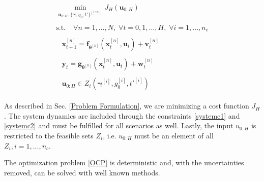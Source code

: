\begin{subequations}
\begin{align}
\begin{split}
\min\limits_{\boldsymbol{u}_{0:H}, \{ \boldsymbol{\gamma}, g_0, t' \}^{[1:n_c]} }  J_H(\boldsymbol{u}_{0:H})
\end{split}\\
\begin{split}
\text{s.t.}\; &\forall n = 1,...,N, \;  \forall t = 0,1,...,H,\; \forall i = 1,...,n_c
\end{split}\\
\begin{split}\label{systemc1}
&\boldsymbol{x}_{t+1}^{[n]} = \boldsymbol{f}_{\boldsymbol{\theta}^{[n]}} \left( \boldsymbol{x}_{t}^{[n]} , \boldsymbol{u}_t \right) + \boldsymbol{v}_{t}^{[n]}
\end{split}\\
\begin{split}\label{systemc2}
&\boldsymbol{y}_{t} = \boldsymbol{g}_{\boldsymbol{\theta}^{[n]}} \left( \boldsymbol{x}_{t}^{[n]}, \boldsymbol{u}_t \right) + \boldsymbol{w}_{t}^{[n]}
\end{split}\\
\begin{split}
 &\boldsymbol{u}_{0:H} \in Z_i(\boldsymbol{\gamma}^{[i]}, g_0^{[i]}, t'^{[i]})
\end{split}
\end{align}
\label{OCP}
\end{subequations}

As described in Sec. \ref{Problem Formulation}, we are minimizing a cost function $J_H$. The system dynamics are included through the constraints \ref{systemc1} and \ref{systemc2} and must be fulfilled for all scenarios as well. Lastly, the input $u_{0:H}$ is restricted to the feasible sets $Z_i$, i.e. $u_{0:H}$ must be an element of all $Z_i, i = 1,...,n_c$.

The optimization problem \ref{OCP} is deterministic and, with the uncertainties removed, can be solved with well known methods. 




